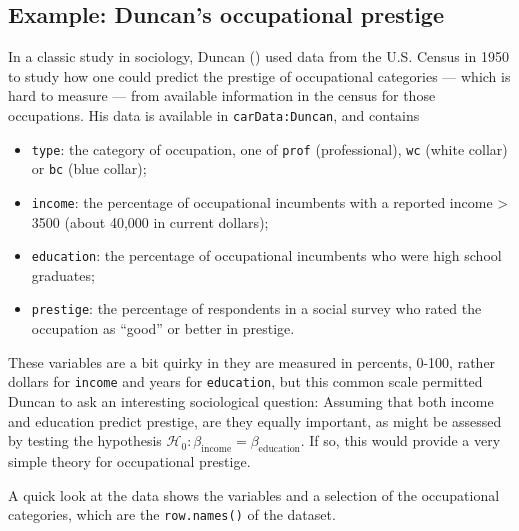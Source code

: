 \documentclass[
  letterpaper,
  10pt,
  krantz2]{krantz}
\providecommand{\tightlist}{%
  \setlength{\itemsep}{0pt}\setlength{\parskip}{0pt}}\usepackage{longtable,booktabs,array}
\begin{document}
\subsection{Example: Duncan's occupational
prestige}\label{sec-example-duncan}

In a classic study in sociology, Duncan ()
used data from the U.S. Census in 1950 to study how one could predict
the prestige of occupational categories --- which is hard to measure ---
from available information in the census for those occupations. His data
is available in \texttt{carData:Duncan}, and contains

\begin{itemize}
\tightlist
\item
  \texttt{type}: the category of occupation, one of \texttt{prof}
  (professional), \texttt{wc} (white collar) or \texttt{bc} (blue
  collar);
\item
  \texttt{income}: the percentage of occupational incumbents with a
  reported income \textgreater{} 3500 (about 40,000 in current dollars);
\item
  \texttt{education}: the percentage of occupational incumbents who were
  high school graduates;
\item
  \texttt{prestige}: the percentage of respondents in a social survey
  who rated the occupation as ``good'' or better in prestige.
\end{itemize}

These variables are a bit quirky in they are measured in percents,
0-100, rather dollars for \texttt{income} and years for
\texttt{education}, but this common scale permitted Duncan to ask an
interesting sociological question: Assuming that both income and
education predict prestige, are they equally important, as might be
assessed by testing the hypothesis
\(\mathcal{H}_0: \beta_{\text{income}} = \beta_{\text{education}}\). If
so, this would provide a very simple theory for occupational prestige.

A quick look at the data shows the variables and a selection of the
occupational categories, which are the \texttt{row.names()} of the
dataset.
\end{document}

